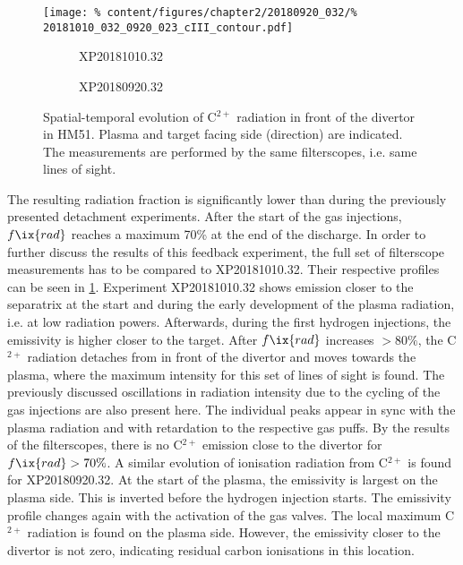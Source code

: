                 \begin{figure}[t]%
                    \centering%
                    \texttt{[image: \%
                        content/figures/chapter2/20180920\_032/\%
                        20181010\_032\_0920\_023\_cIII\_contour.pdf]}\\%
                    \begin{subfigure}{.48\textwidth}%
                        \caption{XP20181010.32}\end{subfigure}%
                    \begin{subfigure}{.48\textwidth}%
                        \caption{XP20180920.32}\end{subfigure}%
                    \caption{Spatial-temporal evolution of C$^{2+}$ radiation in front of the divertor in HM51. Plasma and target facing side (direction) are indicated. The measurements are performed by the same filterscopes, i.e. same lines of sight.}\label{fig:20180920.32_cIII}%
                \end{figure}%
%
                The resulting radiation fraction is significantly lower than during the previously presented detachment experiments. After the start of the gas injections, $f\ix{rad}$ reaches a maximum 70\% at the end of the discharge. In order to further discuss the results of this feedback experiment, the full set of filterscope measurements has to be compared to XP20181010.32. Their respective profiles can be seen in \cref{fig:20180920.32_cIII}. Experiment XP20181010.32 shows emission closer to the separatrix at the start and during the early development of the plasma radiation, i.e. at low radiation powers. Afterwards, during the first hydrogen injections, the emissivity is higher closer to the target. After $f\ix{rad}$ increases $>80\%$, the C$^{2+}$ radiation detaches from in front of the divertor and moves towards the plasma, where the maximum intensity for this set of lines of sight is found. The previously discussed oscillations in radiation intensity due to the cycling of the gas injections are also present here. The individual peaks appear in sync with the plasma radiation and with retardation to the respective gas puffs. By the results of the filterscopes, there is no C$^{2+}$ emission close to the divertor for $f\ix{rad}>70\%$. A similar evolution of ionisation radiation from C$^{2+}$ is found for XP20180920.32. At the start of the plasma, the emissivity is largest on the plasma side. This is inverted before the hydrogen injection starts. The emissivity profile changes again with the activation of the gas valves. The local maximum C$^{2+}$ radiation is found on the plasma side. However, the emissivity closer to the divertor is not zero, indicating residual carbon ionisations in this location.\\%

